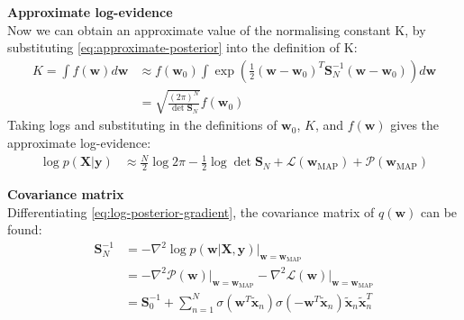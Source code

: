 \documentclass[a4paper]{article}
\begin{document}
    \vspace{\baselineskip}
    \noindent\textbf{Approximate log-evidence} \\
    Now we can obtain an approximate value of the normalising constant K, by substituting \autoref{eq:approximate-posterior} into the definition of K:
    \begin{align}
        K = \int f(\bm{w}) d\bm{w} &\approx f(\bm{w}_0) \int \exp \left(\frac{1}{2} (\bm{w} - \bm{w}_0)^T \bm{S}_N^{-1} (\bm{w} - \bm{w}_0) \right) d\bm{w} \nonumber \\
        &= \sqrt{\frac{(2\pi)^N}{\det \bm{S}_N}} f(\bm{w}_0) \nonumber
    \end{align}
    Taking logs and substituting in the definitions of $\bm{w}_0$, $K$, and $f(\bm{w})$ gives the approximate log-evidence:
    \begin{align}
        \log p(\bm{X} | \bm{y}) &\approx  \frac{N}{2}\log 2\pi - \frac{1}{2}\log \det \bm{S}_N + \mathcal{L}(\bm{w}_\text{MAP}) + \mathcal{P}(\bm{w}_\text{MAP})
        \label{eq:approximate-log-evidence}
    \end{align}

    \vspace{\baselineskip}
    \noindent\textbf{Covariance matrix} \\
    Differentiating \autoref{eq:log-posterior-gradient}, the covariance matrix of $q(\bm{w})$ can be found:
    \begin{align}
        \bm{S}_N^{-1} &= -\nabla^2 \log p(\bm{w} | \bm{X}, \bm{y}) \big|_{\bm{w} = \bm{w}_{\text{MAP}}} \nonumber \\
        &= -\nabla^2 \mathcal{P}(\bm{w}) \big|_{\bm{w} = \bm{w}_{\text{MAP}}} -\nabla^2 \mathcal{L}(\bm{w})\big|_{\bm{w} = \bm{w}_{\text{MAP}}} \nonumber \\
        &= \bm{S}_0^{-1}
        + \sum_{n=1}^N \sigma(\bm{w}^T \tilde{\bm{x}}_n) \sigma(-\bm{w}^T \tilde{\bm{x}}_n)\tilde{\bm{x}}_n\tilde{\bm{x}}_n^T
        \label{eq:covariance-matrix}
    \end{align}
\end{document}
